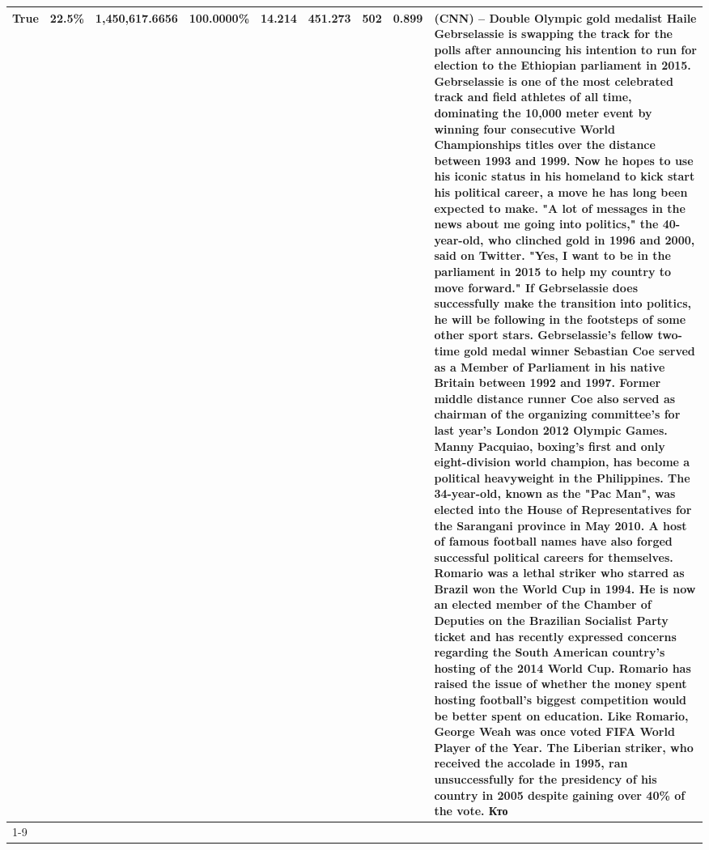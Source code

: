 \begin{table}[H]
{\begin{tabular}{lllrlllll}
True & 22.5\% & 1,450,617.6656 & \bfseries \color{red} 100.0000\% & 14.214 & 451.273 & 502 & 0.899 & (CNN) -- Double Olympic gold medalist Haile Gebrselassie is swapping the track for the polls after announcing his intention to run for election to the Ethiopian parliament in 2015. Gebrselassie is one of the most celebrated track and field athletes of all time, dominating the 10,000 meter event by winning four consecutive World Championships titles over the distance between 1993 and 1999. Now he hopes to use his iconic status in his homeland to kick start his political career, a move he has long been expected to make. "A lot of messages in the news about me going into politics," the 40-year-old, who clinched gold in 1996 and 2000, said on Twitter. "Yes, I want to be in the parliament in 2015 to help my country to move forward." If Gebrselassie does successfully make the transition into politics, he will be following in the footsteps of some other sport stars. Gebrselassie's fellow two-time gold medal winner Sebastian Coe served as a Member of Parliament in his native Britain between 1992 and 1997. Former middle distance runner Coe also served as chairman of the organizing committee's for last year's London 2012 Olympic Games. Manny Pacquiao, boxing's first and only eight-division world champion, has become a political heavyweight in the Philippines. The 34-year-old, known as the "Pac Man", was elected into the House of Representatives for the Sarangani province in May 2010. A host of famous football names have also forged successful political careers for themselves. Romario was a lethal striker who starred as Brazil won the World Cup in 1994. He is now an elected member of the Chamber of Deputies on the Brazilian Socialist Party ticket and has recently expressed concerns regarding the South American country's hosting of the 2014 World Cup. Romario has raised the issue of whether the money spent hosting football's biggest competition would be better spent on education. Like Romario, George Weah was once voted FIFA World Player of the Year. The Liberian striker, who received the accolade in 1995, ran unsuccessfully for the presidency of his country in 2005 despite gaining over 40\% of the vote. Кто \\
\cline{1-9}

\end{tabular}}
\end{table}
